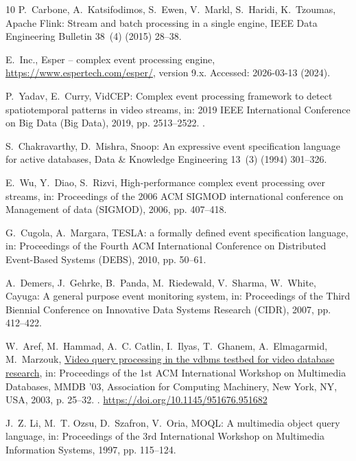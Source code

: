 \documentclass[5p,times]{elsarticle}
\begin{document}
\begin{thebibliography}{10}
P.~Carbone, A.~Katsifodimos, S.~Ewen, V.~Markl, S.~Haridi, K.~Tzoumas, Apache {Flink}: Stream and batch processing in a single engine, IEEE Data Engineering Bulletin 38~(4) (2015) 28--38.

E.~Inc., Esper -- complex event processing engine, \url{https://www.espertech.com/esper/}, version 9.x. Accessed: 2026-03-13 (2024).

P.~Yadav, E.~Curry, {VidCEP}: Complex event processing framework to detect spatiotemporal patterns in video streams, in: 2019 IEEE International Conference on Big Data (Big Data), 2019, pp. 2513--2522.
\newblock \href {http://dx.doi.org/10.1109/BigData47090.2019.9006018} {}.

S.~Chakravarthy, D.~Mishra, Snoop: An expressive event specification language for active databases, Data \& Knowledge Engineering 13~(3) (1994) 301--326.

E.~Wu, Y.~Diao, S.~Rizvi, High-performance complex event processing over streams, in: Proceedings of the 2006 ACM SIGMOD international conference on Management of data (SIGMOD), 2006, pp. 407--418.

G.~Cugola, A.~Margara, {TESLA}: a formally defined event specification language, in: Proceedings of the Fourth ACM International Conference on Distributed Event-Based Systems (DEBS), 2010, pp. 50--61.

A.~Demers, J.~Gehrke, B.~Panda, M.~Riedewald, V.~Sharma, W.~White, Cayuga: A general purpose event monitoring system, in: Proceedings of the Third Biennial Conference on Innovative Data Systems Research (CIDR), 2007, pp. 412--422.

W.~Aref, M.~Hammad, A.~C. Catlin, I.~Ilyas, T.~Ghanem, A.~Elmagarmid, M.~Marzouk, \href{https://doi.org/10.1145/951676.951682}{Video query processing in the vdbms testbed for video database research}, in: Proceedings of the 1st ACM International Workshop on Multimedia Databases, MMDB '03, Association for Computing Machinery, New York, NY, USA, 2003, p. 25–32.
\newblock \href {http://dx.doi.org/10.1145/951676.951682} {}.
\newline\urlprefix\url{https://doi.org/10.1145/951676.951682}

J.~Z. Li, M.~T. Ozsu, D.~Szafron, V.~Oria, {MOQL}: A multimedia object query language, in: Proceedings of the 3rd International Workshop on Multimedia Information Systems, 1997, pp. 115--124.


\end{thebibliography}
\end{document}
